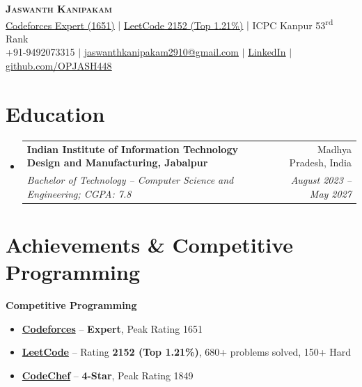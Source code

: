 \documentclass[letterpaper,11pt]{article}
\makeatletter
\newcommand{\resumeItem}[1]{
  \item\small{
    {#1 \vspace{-2pt}}
  }
}
\newcommand{\resumeSubheading}[4]{
  \vspace{-2pt}\item
    \begin{tabular*}{0.97\textwidth}[t]{l@{\extracolsep{\fill}}r}
      \textbf{#1} & #2 \\
      \textit{\small#3} & \textit{\small #4} \\
    \end{tabular*}\vspace{-7pt}
}
\newcommand{\resumeSubHeadingListStart}{\begin{itemize}[leftmargin=0.15in, label={}]}
\newcommand{\resumeSubHeadingListEnd}{\end{itemize}}
\makeatother
\begin{document}
\begin{center}
    \textbf{\Huge \scshape Jaswanth Kanipakam} \\ \vspace{3pt}
    \small
    \href{https://codeforces.com/profile/OP_JASH}{\underline{Codeforces Expert (1651)}} $|$
    \href{https://leetcode.com/u/OP_jash12-3/}{\underline{LeetCode 2152 (Top 1.21\%)}} $|$
    ICPC Kanpur 53\textsuperscript{rd} Rank \\ \vspace{3pt}
    +91-9492073315 $|$
    \href{mailto:jaswanthkanipakam2910@gmail.com}{\underline{jaswanthkanipakam2910@gmail.com}} $|$
    \href{https://www.linkedin.com/in/jaswanth-kanipakam-6b7078298/}{\underline{LinkedIn}} $|$
    \href{https://github.com/OPJASH448}{\underline{github.com/OPJASH448}}
\end{center}

\section{Education}
  \resumeSubHeadingListStart
    \resumeSubheading
      {Indian Institute of Information Technology Design and Manufacturing, Jabalpur}{Madhya Pradesh, India}
      {Bachelor of Technology -- Computer Science and Engineering; CGPA: 7.8}{August 2023 -- May 2027}
  \resumeSubHeadingListEnd

\section{Achievements \& Competitive Programming}

\textbf{Competitive Programming}
\begin{itemize}[leftmargin=*, itemsep=1pt, topsep=2pt, parsep=0pt]
    \resumeItem{\href{https://codeforces.com/profile/OP_JASH}{\textbf{Codeforces}} -- \textbf{Expert}, Peak Rating 1651}
    \resumeItem{\href{https://leetcode.com/u/OP_jash12-3/}{\textbf{LeetCode}} -- Rating \textbf{2152 (Top 1.21\%)}, 680+ problems solved, 150+ Hard}
    \resumeItem{\href{https://www.codechef.com/users/jaswanth_k123}{\textbf{CodeChef}} -- \textbf{4-Star}, Peak Rating 1849}
\end{itemize}

\vspace{4pt}
\end{document}
